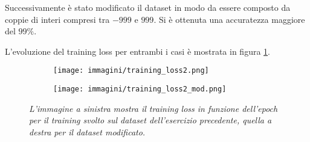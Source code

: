 \documentclass{article}
\begin{document}
Successivamente è stato modificato il dataset in modo da essere composto da coppie di interi compresi tra $-999$ e $999$. Si è ottenuta una accuratezza maggiore del $99\%$. 

L'evoluzione del training loss per entrambi i casi è mostrata in figura \ref{fig:loss_evolution_2}.

\begin{figure}[H]
    \centering
    \begin{subfigure}[b]{0.49\textwidth}
        \centering
        \texttt{[image: immagini/training\_loss2.png]}
    \end{subfigure}
    \begin{subfigure}[b]{0.49\textwidth}
        \centering
        \texttt{[image: immagini/training\_loss2\_mod.png]}
    \end{subfigure}

    \caption{\emph{L'immagine a sinistra mostra il training loss in funzione dell'epoch per il training svolto sul dataset dell'esercizio precedente, quella a destra per il dataset modificato.}}
    \label{fig:loss_evolution_2}
\end{figure}
\end{document}
